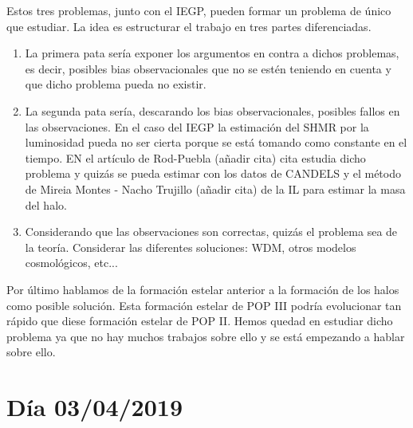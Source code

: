 Estos tres problemas, junto con el IEGP, pueden formar un problema de único que estudiar. La idea es estructurar el trabajo en tres partes diferenciadas.
\begin{enumerate}
\item La primera pata sería exponer los argumentos en contra a dichos problemas, es decir, posibles bias observacionales que no se estén teniendo en cuenta y que dicho problema pueda no existir.
\item La segunda pata sería, descarando los bias observacionales, posibles fallos en las observaciones. En el caso del IEGP la estimación del SHMR por la luminosidad pueda no ser cierta porque se está tomando como constante en el tiempo. EN el artículo de Rod-Puebla (añadir cita) cita estudia dicho problema y quizás se pueda estimar con los datos de CANDELS y el método de Mireia Montes - Nacho Trujillo (añadir cita) de la IL para estimar la masa del halo.
\item Considerando que las observaciones son correctas, quizás el problema sea de la teoría. Considerar las diferentes soluciones: WDM, otros modelos cosmológicos, etc...
\end{enumerate}

Por último hablamos de la formación estelar anterior a la formación de los halos como posible solución. Esta formación estelar de POP III podría evolucionar tan rápido que diese formación estelar de POP II. Hemos quedad en estudiar dicho problema ya que no hay muchos trabajos sobre ello y se está empezando a hablar sobre ello.


\section*{Día 03/04/2019}
